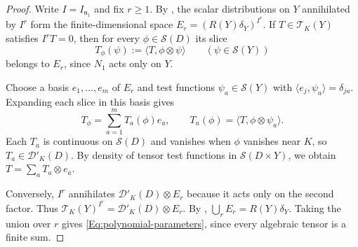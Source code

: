 \documentclass[a4paper,12pt]{amsart}
\numberwithin{equation}{section}
\theoremstyle{plain}
\theoremstyle{definition}
\theoremstyle{remark}
\begin{document}
\begin{proof}
Write $I=I_{\mathfrak n_1}$ and fix $r\geq1$.
By \cite[Lemma~3.3(i)]{LLY}, the scalar distributions on $Y$ annihilated by $I^r$ form the finite-dimensional space $E_r=(R(Y)\delta_Y)^{I^r}$.
If $T\in\mathcal T_K(Y)$ satisfies $I^rT=0$, then for every $\phi\in\mathcal S(D)$ its slice
\[
 T_\phi(\psi):=\langle T,\phi\otimes\psi\rangle
 \qquad(\psi\in\mathcal S(Y))
\]
belongs to $E_r$, since $N_1$ acts only on $Y$.

Choose a basis $e_1,\ldots,e_m$ of $E_r$ and test functions $\psi_a\in\mathcal S(Y)$ with $\langle e_j,\psi_a\rangle=\delta_{ja}$.
Expanding each slice in this basis gives
\[
 T_\phi=\sum_{a=1}^m T_a(\phi)e_a,\qquad
 T_a(\phi)=\langle T,\phi\otimes\psi_a\rangle .
\]
Each $T_a$ is continuous on $\mathcal S(D)$ and vanishes when $\phi$ vanishes near $K$, so $T_a\in\mathcal D'_K(D)$.
By density of tensor test functions in $\mathcal S(D\times Y)$, we obtain $T=\sum_a T_a\otimes e_a$.

Conversely, $I^r$ annihilates $\mathcal D'_K(D)\otimes E_r$ because it acts only on the second factor.
Thus $\mathcal T_K(Y)^{I^r}=\mathcal D'_K(D)\otimes E_r$.
By \cite[Lemma~3.3(ii)]{LLY}, $\bigcup_r E_r=R(Y)\delta_Y$.
Taking the union over $r$ gives \eqref{Eq:polynomial-parameters}, since every algebraic tensor is a finite sum.
\end{proof}
\end{document}
